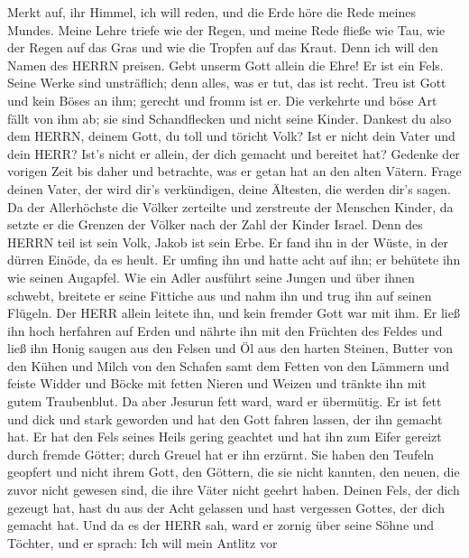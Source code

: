  Merkt auf, ihr Himmel, ich will reden, und die Erde höre
die Rede meines Mundes.  Meine Lehre triefe wie der Regen,
und meine Rede fließe wie Tau, wie der Regen auf das Gras und wie die
Tropfen auf das Kraut.  Denn ich will den Namen des HERRN
preisen. Gebt unserm Gott allein die Ehre!  Er ist ein Fels.
Seine Werke sind unsträflich; denn alles, was er tut, das ist recht.
Treu ist Gott und kein Böses an ihm; gerecht und fromm ist er.
 Die verkehrte und böse Art fällt von ihm ab; sie sind
Schandflecken und nicht seine Kinder.  Dankest du also dem
HERRN, deinem Gott, du toll und töricht Volk? Ist er nicht dein Vater
und dein HERR? Ist's nicht er allein, der dich gemacht und bereitet hat?
 Gedenke der vorigen Zeit bis daher und betrachte, was er
getan hat an den alten Vätern. Frage deinen Vater, der wird dir's
verkündigen, deine Ältesten, die werden dir's sagen.  Da der
Allerhöchste die Völker zerteilte und zerstreute der Menschen Kinder, da
setzte er die Grenzen der Völker nach der Zahl der Kinder Israel.
 Denn des HERRN teil ist sein Volk, Jakob ist sein Erbe.
 Er fand ihn in der Wüste, in der dürren Einöde, da es
heult. Er umfing ihn und hatte acht auf ihn; er behütete ihn wie seinen
Augapfel.  Wie ein Adler ausführt seine Jungen und über
ihnen schwebt, breitete er seine Fittiche aus und nahm ihn und trug ihn
auf seinen Flügeln.  Der HERR allein leitete ihn, und kein
fremder Gott war mit ihm.  Er ließ ihn hoch herfahren auf
Erden und nährte ihn mit den Früchten des Feldes und ließ ihn Honig
saugen aus den Felsen und Öl aus den harten Steinen, 
Butter von den Kühen und Milch von den Schafen samt dem Fetten von den
Lämmern und feiste Widder und Böcke mit fetten Nieren und Weizen und
tränkte ihn mit gutem Traubenblut.  Da aber Jesurun fett
ward, ward er übermütig. Er ist fett und dick und stark geworden und hat
den Gott fahren lassen, der ihn gemacht hat. Er hat den Fels seines
Heils gering geachtet  und hat ihn zum Eifer gereizt durch
fremde Götter; durch Greuel hat er ihn erzürnt.  Sie haben
den Teufeln geopfert und nicht ihrem Gott, den Göttern, die sie nicht
kannten, den neuen, die zuvor nicht gewesen sind, die ihre Väter nicht
geehrt haben.  Deinen Fels, der dich gezeugt hat, hast du
aus der Acht gelassen und hast vergessen Gottes, der dich gemacht hat.
 Und da es der HERR sah, ward er zornig über seine Söhne
und Töchter,  und er sprach: Ich will mein Antlitz vor
